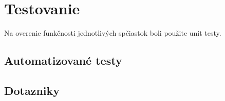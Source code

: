 \newpage

\section{Testovanie}

Na overenie funkčnosti jednotlivých spčiastok boli použite unit testy.

\subsection{Automatizované testy}

\subsection{Dotazniky}
